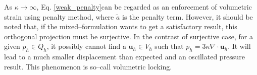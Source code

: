 As $\kappa \rightarrow \infty$, Eq. \eqref{weak_penalty}can be regarded as an enforcement of volumetric strain using penalty method, 
where $\tilde a$ is the penalty term.
However, it should be noted that, if the mixed--formulation wants to get a satisfactory result, this orthogonal projection must be surjective\cite{stein2004}.
In the contrast of surjective case,
for a given $p_h\in Q_h$, it possibly cannot find a $\boldsymbol u_h \in V_h$ such that $p_h = 3\kappa \nabla \cdot \boldsymbol u_h$. 
It will lead to a much smaller displacement than expected and an oscillated pressure result. 
This phenomenon is so--call volumetric locking.

